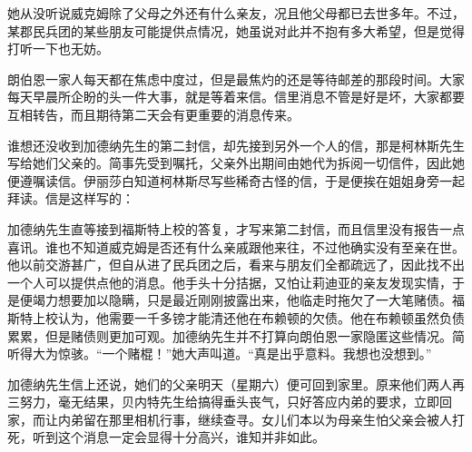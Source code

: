 \par 她从没听说威克姆除了父母之外还有什么亲友，况且他父母都已去世多年。不过，某郡民兵团的某些朋友可能提供点情况，她虽说对此并不抱有多大希望，但是觉得打听一下也无妨。
\par 朗伯恩一家人每天都在焦虑中度过，但是最焦灼的还是等待邮差的那段时间。大家每天早晨所企盼的头一件大事，就是等着来信。信里消息不管是好是坏，大家都要互相转告，而且期待第二天会有更重要的消息传来。
\par 谁想还没收到加德纳先生的第二封信，却先接到另外一个人的信，那是柯林斯先生写给她们父亲的。简事先受到嘱托，父亲外出期间由她代为拆阅一切信件，因此她便遵嘱读信。伊丽莎白知道柯林斯尽写些稀奇古怪的信，于是便挨在姐姐身旁一起拜读。信是这样写的：
\par 加德纳先生直等接到福斯特上校的答复，才写来第二封信，而且信里没有报告一点喜讯。谁也不知道威克姆是否还有什么亲戚跟他来往，不过他确实没有至亲在世。他以前交游甚广，但自从进了民兵团之后，看来与朋友们全都疏远了，因此找不出一个人可以提供点他的消息。他手头十分拮据，又怕让莉迪亚的亲友发现实情，于是便竭力想要加以隐瞒，只是最近刚刚披露出来，他临走时拖欠了一大笔赌债。福斯特上校认为，他需要一千多镑才能清还他在布赖顿的欠债。他在布赖顿虽然负债累累，但是赌债则更加可观。加德纳先生并不打算向朗伯恩一家隐匿这些情况。简听得大为惊骇。“一个赌棍！”她大声叫道。“真是出乎意料。我想也没想到。”
\par 加德纳先生信上还说，她们的父亲明天（星期六）便可回到家里。原来他们两人再三努力，毫无结果，贝内特先生给搞得垂头丧气，只好答应内弟的要求，立即回家，而让内弟留在那里相机行事，继续查寻。女儿们本以为母亲生怕父亲会被人打死，听到这个消息一定会显得十分高兴，谁知并非如此。
